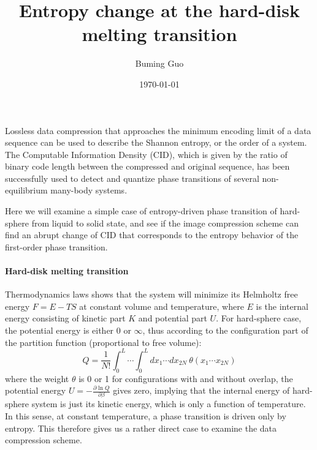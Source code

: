 \documentclass[a4paper]{article}
\title{Entropy change at the hard-disk melting transition}
\author{Buming Guo}
\date{\today}
\begin{document}
\maketitle

Lossless data compression that approaches the minimum encoding limit of a data sequence can be used to describe the Shannon entropy, or the order of a system. The Computable Information Density (CID), which is given by the ratio of binary code length between the compressed and original sequence, has been successfully used to detect and quantize phase transitions of several non-equilibrium many-body systems\cite{2017arXiv170804993M}. 

Here we will examine a simple case of entropy-driven phase transition of hard-sphere from liquid to solid state, and see if the image compression scheme can find an abrupt change of CID that corresponds to the entropy behavior of the first-order phase transition.


\paragraph{Hard-disk melting transition}

Thermodynamics laws shows that the system will minimize its Helmholtz free energy $F = E - TS$ at constant volume and temperature, where $E$ is the internal energy consisting of kinetic part $K$ and potential part $U$. For hard-sphere case, the potential energy is either 0 or $\infty$, thus according to the configuration part of the partition function (proportional to free volume):
\begin{equation}
Q = \frac{1}{N!} \int_{0}^{L} \dotsm \int_{0}^{L} dx_1 \dotsm dx_{2N} ~\theta(x_1 \dotsm x_{2N})
\end{equation}
where the weight $\theta$ is 0 or 1 for configurations with and without overlap, the potential energy $U = - \frac{\partial \ln Q}{\partial \beta}$ gives zero, implying that the internal energy of hard-sphere system is just its kinetic energy, which is only a function of temperature. In this sense, at constant temperature, a phase transition is driven only by entropy. This therefore gives us a rather direct case to examine the data compression scheme.
\end{document}
